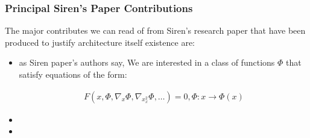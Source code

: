 



\begin{frame}
\frametitle{Principal Siren's Paper Contributions}
The major contributes we can read of from Siren's research paper that have been produced to justify architecture itself existence are:

\begin{itemize}
\item as Siren paper's authors say, We are interested in a class of functions $\Phi$ that satisfy equations of the form:

\begin{align}
F(x, \Phi, \nabla_{x}\Phi, \nabla_{x}_{x}^{2}\Phi, \dots) = 0, \Phi:x\rightarrow\Phi(x)
\end{align}
\item 
\item 
\end{itemize}


\end{frame}